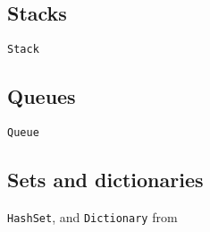 \subsection{Stacks}
\lstinline[language=console]|Stack|
\subsection{Queues}  
\lstinline[language=console]|Queue|
\subsection{Sets and dictionaries}
\lstinline[language=console]|HashSet|,  and \lstinline[language=console]|Dictionary| from  

